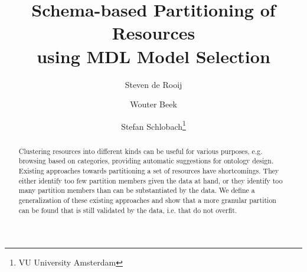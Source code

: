 \documentclass{ecai2014}
\begin{document}
\title{
  Schema-based Partitioning of Resources\\
  using MDL Model Selection
}

\author{Steven de Rooij \and Wouter Beek \and Stefan Schlobach\footnote{
  VU University Amsterdam}}

\maketitle

\begin{abstract}
Clustering resources into different kinds can be useful
 for various purposes, e.g. browsing based on categories,
 providing automatic suggestions for ontology design.
Existing approaches towards partitioning a set of resources
 have shortcomings.
They either identify too few partition members
 given the data at hand,
 or they identify too many partition members
 than can be substantiated by the data. 
We define a generalization of these existing approaches
 and show that a more granular partition can be found
 that is still validated by the data, i.e. that do not overfit.
\end{abstract}


%






%








\end{document}
